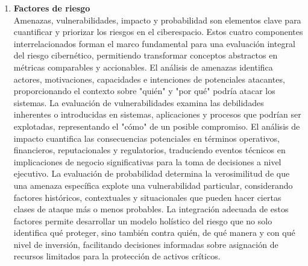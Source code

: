 \begin{enumerate}
\item \textbf{Factores de riesgo} \\
Amenazas, vulnerabilidades, impacto y probabilidad son elementos clave para cuantificar y priorizar los riesgos en el ciberespacio. Estos cuatro componentes interrelacionados forman el marco fundamental para una evaluación integral del riesgo cibernético, permitiendo transformar conceptos abstractos en métricas comparables y accionables. El análisis de amenazas identifica actores, motivaciones, capacidades e intenciones de potenciales atacantes, proporcionando el contexto sobre "quién" y "por qué" podría atacar los sistemas. La evaluación de vulnerabilidades examina las debilidades inherentes o introducidas en sistemas, aplicaciones y procesos que podrían ser explotadas, representando el "cómo" de un posible compromiso. El análisis de impacto cuantifica las consecuencias potenciales en términos operativos, financieros, reputacionales y regulatorios, traduciendo eventos técnicos en implicaciones de negocio significativas para la toma de decisiones a nivel ejecutivo. La evaluación de probabilidad determina la verosimilitud de que una amenaza específica explote una vulnerabilidad particular, considerando factores históricos, contextuales y situacionales que pueden hacer ciertas clases de ataque más o menos probables. La integración adecuada de estos factores permite desarrollar un modelo holístico del riesgo que no solo identifica qué proteger, sino también contra quién, de qué manera y con qué nivel de inversión, facilitando decisiones informadas sobre asignación de recursos limitados para la protección de activos críticos.


\end{enumerate}
